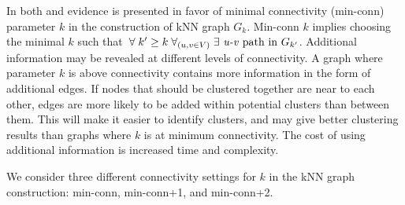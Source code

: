 \documentclass{bmcart}
\begin{document}
In both \cite{ICDM} and \cite{cukierski2008using} evidence is presented in favor of minimal connectivity (min-conn) parameter $k$ in the construction of kNN graph $G_k$. 
Min-conn $k$ implies choosing the minimal $k$ such that $\: \forall \;k' \ge k \; \forall_{(u, v \in V)}   \; \exists \text{ \textit{u-v} path in } G_{k'}$.
Additional information may be revealed at different levels of connectivity. 
A graph where parameter $k$ is above connectivity contains more information in the form of additional edges. If nodes that should be clustered together are near to each other, edges are more likely to be added within potential clusters than between them. This will make it easier to identify clusters, and may give better clustering results than graphs where $k$ is at minimum connectivity. The cost of using additional information is increased time and complexity.

We consider three different connectivity settings for $k$ in the kNN graph construction: min-conn, min-conn+1, and min-conn+2.  




\end{document}
